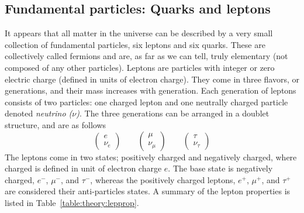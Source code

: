 \subsection{Fundamental particles: Quarks and leptons}
It appears that all matter in the universe can be described by a very small collection of fundamental particles, six leptons and six quarks. These are collectively called fermions and are, as far as we can tell, truly elementary (not composed of any other particles).
Leptons are particles with integer or zero electric charge (defined in units of electron charge). They come in three flavors, or generations, and their mass increases with generation. Each generation of leptons consists of two particles: one charged lepton and one neutrally charged particle denoted \emph{neutrino ($\nu$)}. The three generations can be arranged in a doublet structure, and are as follows
\begin{equation}
\label{eqn:lepton_flavor_doublets}
\begin{pmatrix} e       \\ \nu_e      \end{pmatrix} \qquad
\begin{pmatrix} \mu     \\ \nu_{\mu}  \end{pmatrix} \qquad
\begin{pmatrix} \tau    \\ \nu_{\tau} \end{pmatrix}
\end{equation}
The leptons come in two states; positively charged and negatively charged, where charged is defined in unit of electron charge $e$. The base state is negatively charged, $e^{-}$, $\mu^{-}$, and $\tau^{-}$,  whereas the positively charged leptons,  $e^{+}$, $\mu^{+}$, and $\tau^{+}$ are considered their anti-particles states.
A summary of the lepton properties is listed in Table~\ref{table:theory:lepprop}.
